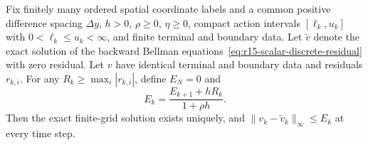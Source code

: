 \begin{proposition}
\label{prop:r15scalarresidual}
Fix finitely many ordered spatial coordinate labels and a common positive
difference spacing $\Delta y$,
$h>0$, $\rho\ge0$, $\eta\ge0$, compact action intervals
$[\ell_k,u_k]$ with $0<\ell_k\le u_k<\infty$, and finite terminal and
boundary data.  Let $\widetilde v$ denote the exact solution of the backward
Bellman equations~\eqref{eq:r15-scalar-discrete-residual} with zero residual.
Let $v$ have identical terminal and boundary data and residuals $r_{k,i}$.
For any $R_k\ge\max_i|r_{k,i}|$, define $E_N=0$ and
\begin{equation}
 E_k=\frac{E_{k+1}+hR_k}{1+\rho h}.
 \label{eq:r15-scalar-algebraic-bound}
\end{equation}
Then the exact finite-grid solution exists uniquely, and
$\|v_k-\widetilde v_k\|_\infty\le E_k$ at every time step.
\end{proposition}

